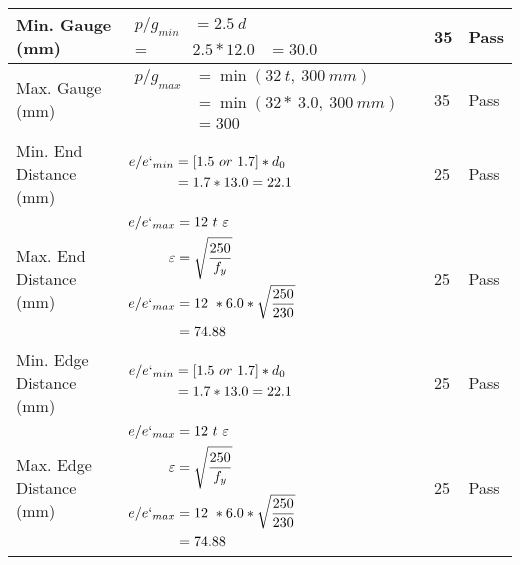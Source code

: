 \documentclass{article}%
\begin{document}
\begin{longtable}{|p{4cm}|p{6cm}|p{5.5cm}|p{1.5cm}|}
\hline%
Min. Gauge (mm)&$\begin{aligned}p/g_{min}&= 2.5 ~ d&\\ =&2.5*12.0&=30.0\end{aligned}$&35&Pass\\%
\hline%
Max. Gauge (mm)&$\begin{aligned}p/g_{max} &=\min(32~t,~300~mm)&\\ &=\min(32 *~3.0,~ 300 ~mm)\\&=300\end{aligned}$&35&Pass\\%
\hline%
Min. End Distance (mm)&$\begin{aligned}e/e`_{min} &=[1.5~or~ 1.7] * d_0\\ &=1.7*13.0=22.1 \end{aligned}$&25&Pass\\%
\hline%
Max. End Distance (mm)&$\begin{aligned}e/e`_{max} &= 12~ t~ \varepsilon&\\ \varepsilon &= \sqrt{\frac{250}{f_y}}\\ e/e`_{max}&=12 ~*6.0*\sqrt{\frac{250}{230}}\\ &=74.88\\ \end{aligned}$&25&Pass\\%
\hline%
Min. Edge Distance (mm)&$\begin{aligned}e/e`_{min} &=[1.5~or~ 1.7] * d_0\\ &=1.7*13.0=22.1 \end{aligned}$&25&Pass\\%
\hline%
Max. Edge Distance (mm)&$\begin{aligned}e/e`_{max} &= 12~ t~ \varepsilon&\\ \varepsilon &= \sqrt{\frac{250}{f_y}}\\ e/e`_{max}&=12 ~*6.0*\sqrt{\frac{250}{230}}\\ &=74.88\\ \end{aligned}$&25&Pass\\%
\hline%
\end{longtable}

%
\end{document}
